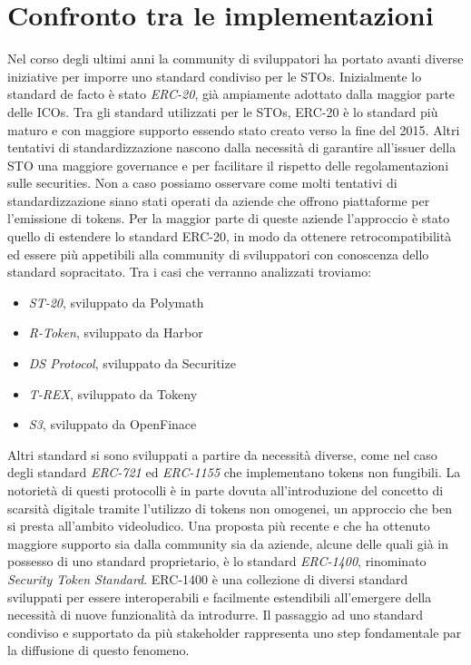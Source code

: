 \chapter{Confronto tra le implementazioni}
Nel corso degli ultimi anni la community di sviluppatori ha portato avanti diverse iniziative per imporre uno standard condiviso per le STOs. Inizialmente lo standard de facto è stato \textit{ERC-20}\cite{K37}, già ampiamente adottato dalla maggior parte delle ICOs. Tra gli standard utilizzati per le STOs, ERC-20 è lo standard più maturo e con maggiore supporto essendo stato creato verso la fine del 2015. Altri tentativi di standardizzazione nascono dalla necessità di garantire all'issuer della STO una maggiore governance e per facilitare il rispetto delle regolamentazioni sulle securities. Non a caso possiamo osservare come molti tentativi di standardizzazione siano stati operati da aziende che offrono piattaforme per l'emissione di tokens. Per la maggior parte di queste aziende l'approccio è stato quello di estendere lo standard ERC-20, in modo da ottenere retrocompatibilità ed essere più appetibili alla community di sviluppatori con conoscenza dello standard sopracitato. Tra i casi che verranno analizzati troviamo: 
\begin{itemize}
    \item \textit{ST-20}, sviluppato da Polymath
    \item \textit{R-Token}, sviluppato da Harbor
    \item \textit{DS Protocol}, sviluppato da Securitize
    \item \textit{T-REX}, sviluppato da Tokeny
    \item \textit{S3}, sviluppato da OpenFinace
\end{itemize}

Altri standard si sono sviluppati a partire da necessità diverse, come nel caso degli standard \textit{ERC-721} ed \textit{ERC-1155} che implementano tokens non fungibili. La notorietà di questi protocolli è in parte dovuta all'introduzione del concetto di scarsità digitale tramite l'utilizzo di tokens non omogenei, un approccio che ben si presta all'ambito videoludico. 
Una proposta più recente e che ha ottenuto maggiore supporto sia dalla community sia da aziende, alcune delle quali già in possesso di uno standard proprietario, è lo standard \textit{ERC-1400}, rinominato \textit{Security Token Standard}. ERC-1400 è una collezione di diversi standard sviluppati per essere interoperabili e facilmente estendibili all'emergere della necessità di nuove funzionalità da introdurre. Il passaggio ad uno standard condiviso e supportato da più stakeholder rappresenta uno step fondamentale par la diffusione di questo fenomeno.

